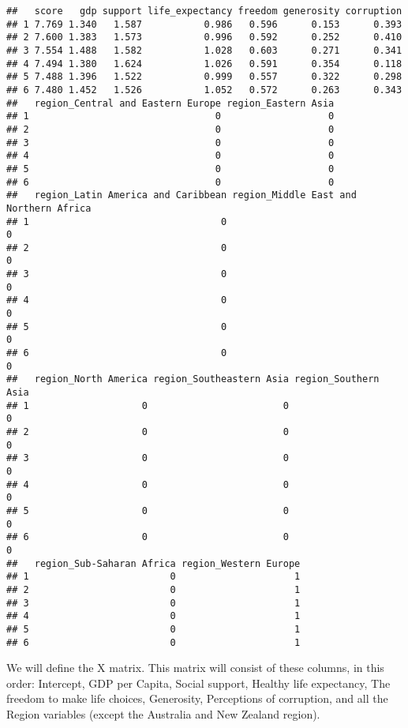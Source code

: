 \documentclass[
]{article}
\begin{document}
\begin{verbatim}
##   score   gdp support life_expectancy freedom generosity corruption
## 1 7.769 1.340   1.587           0.986   0.596      0.153      0.393
## 2 7.600 1.383   1.573           0.996   0.592      0.252      0.410
## 3 7.554 1.488   1.582           1.028   0.603      0.271      0.341
## 4 7.494 1.380   1.624           1.026   0.591      0.354      0.118
## 5 7.488 1.396   1.522           0.999   0.557      0.322      0.298
## 6 7.480 1.452   1.526           1.052   0.572      0.263      0.343
##   region_Central and Eastern Europe region_Eastern Asia
## 1                                 0                   0
## 2                                 0                   0
## 3                                 0                   0
## 4                                 0                   0
## 5                                 0                   0
## 6                                 0                   0
##   region_Latin America and Caribbean region_Middle East and Northern Africa
## 1                                  0                                      0
## 2                                  0                                      0
## 3                                  0                                      0
## 4                                  0                                      0
## 5                                  0                                      0
## 6                                  0                                      0
##   region_North America region_Southeastern Asia region_Southern Asia
## 1                    0                        0                    0
## 2                    0                        0                    0
## 3                    0                        0                    0
## 4                    0                        0                    0
## 5                    0                        0                    0
## 6                    0                        0                    0
##   region_Sub-Saharan Africa region_Western Europe
## 1                         0                     1
## 2                         0                     1
## 3                         0                     1
## 4                         0                     1
## 5                         0                     1
## 6                         0                     1
\end{verbatim}

We will define the X matrix. This matrix will consist of these columns,
in this order: Intercept, GDP per Capita, Social support, Healthy life
expectancy, The freedom to make life choices, Generosity, Perceptions of
corruption, and all the Region variables (except the Australia and New
Zealand region).
\end{document}
